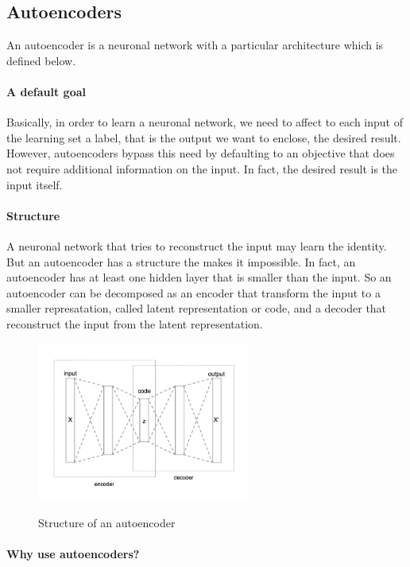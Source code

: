\documentclass[conference]{IEEEtran}
\begin{document}
\subsection{Autoencoders}

An autoencoder is a neuronal network with a particular architecture which is defined below.

\paragraph{A default goal}
Basically, in order to learn a neuronal network, we need to affect to each input of the learning set a label, that is the output we want to enclose, the desired result. However, autoencoders bypass this need by defaulting to an objective that does not require additional information on the input. In fact, the desired result is the input itself.

\paragraph{Structure}
A neuronal network that tries to reconstruct the input may learn the identity. But an autoencoder has a structure the makes it impossible. In fact, an autoencoder has at least one hidden layer that is smaller than the input. So an autoencoder can be decomposed as an encoder that transform the input to a smaller represatation, called latent representation or code, and a decoder that reconstruct the input from the latent representation.

\begin{figure}[!h]
    \centering
    \caption{Structure of an autoencoder}
    \includegraphics[width=7cm]{Autoencoder_structure.png}
    \label{autoencoder_structure}
\end{figure}


\paragraph{Why use autoencoders?}
\end{document}
